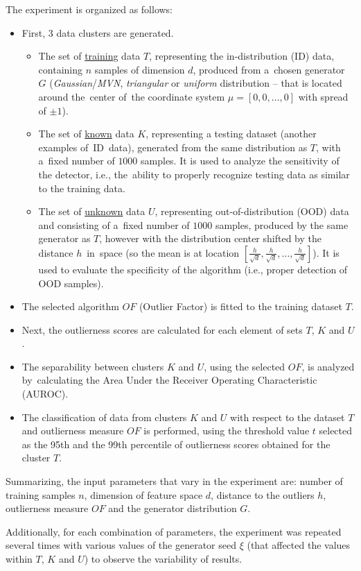 The experiment is organized as follows:
\vspace{-0.5\baselineskip}
\begin{itemize}
    \item First, 3 data clusters are generated.
          \begin{itemize}
              \item The set of \underline{training} data $T$, representing the in-distribution (ID) data, containing $n$ samples of dimension $d$, produced from a~chosen generator~$G$ (\textit{Gaussian}/\textit{MVN}, \textit{triangular} or \textit{uniform} distribution – that is located around the~center of~the coordinate system $\mu = [0, 0, \dots, 0]$ with spread of $\pm 1$).
              \item The set of \underline{known} data $K$, representing a testing dataset (another examples of~ID~data), generated from the same distribution as $T$, with a~fixed number of $1000$ samples. It is used to analyze the sensitivity of the detector, i.e., the~ability to properly recognize testing data as similar to the training data.
              \item The set of \underline{unknown} data $U$, representing out-of-distribution (OOD) data and consisting of a~fixed number of $1000$ samples, produced by the same generator as $T$, however with the distribution center shifted by the distance $h$~in~space (so the mean is at location $[\frac{h}{\sqrt{d}}, \frac{h}{\sqrt{d}}, \dots, \frac{h}{\sqrt{d}}]$). It is used to evaluate the specificity of the algorithm (i.e., proper detection of OOD samples).
          \end{itemize}
    \item The selected algorithm $OF$ (Outlier Factor) is fitted to the training dataset $T$.
    \item Next, the outlierness scores are calculated for each element of sets $T$, $K$ and $U$.
    \item The separability between clusters $K$ and $U$, using the selected $OF$, is analyzed by~calculating the Area Under the Receiver Operating Characteristic (AUROC).
    \item The classification of data from clusters $K$ and $U$ with respect to the dataset $T$ and outlierness measure $OF$ is performed, using the threshold value $t$ selected as the 95th and the 99th percentile of outlierness scores obtained for the cluster $T$.
\end{itemize}

Summarizing, the input parameters that vary in the experiment are: number of training samples $n$, dimension of feature space $d$, distance to the outliers $h$, outlierness measure $OF$ and the generator distribution $G$.

Additionally, for each combination of parameters, the experiment was repeated several times with various values of the generator seed $\xi$ (that affected the values within $T$, $K$ and $U$) to observe the variability of results.




